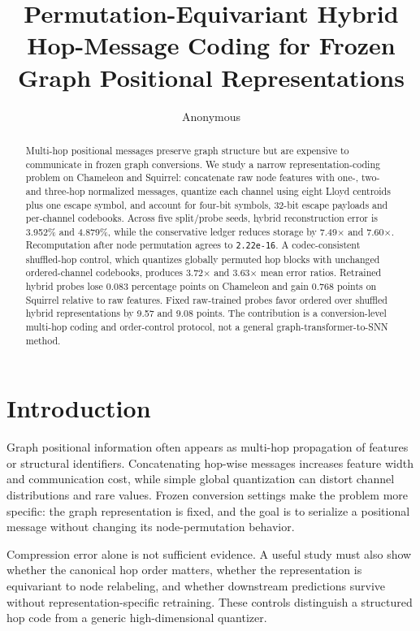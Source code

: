 \documentclass{article}
\title{Permutation-Equivariant Hybrid Hop-Message Coding for Frozen Graph Positional Representations}
\author{Anonymous}
\begin{document}
\begin{abstract}
Multi-hop positional messages preserve graph structure but are expensive to communicate in frozen graph conversions. We study a narrow representation-coding problem on Chameleon and Squirrel: concatenate raw node features with one-, two- and three-hop normalized messages, quantize each channel using eight Lloyd centroids plus one escape symbol, and account for four-bit symbols, 32-bit escape payloads and per-channel codebooks. Across five split/probe seeds, hybrid reconstruction error is 3.952\% and 4.879\%, while the conservative ledger reduces storage by 7.49$\times$ and 7.60$\times$. Recomputation after node permutation agrees to \texttt{2.22e-16}. A codec-consistent shuffled-hop control, which quantizes globally permuted hop blocks with unchanged ordered-channel codebooks, produces 3.72$\times$ and 3.63$\times$ mean error ratios. Retrained hybrid probes lose 0.083 percentage points on Chameleon and gain 0.768 points on Squirrel relative to raw features. Fixed raw-trained probes favor ordered over shuffled hybrid representations by 9.57 and 9.08 points. The contribution is a conversion-level multi-hop coding and order-control protocol, not a general graph-transformer-to-SNN method.
\end{abstract}

\maketitle

\section{Introduction}


Graph positional information often appears as multi-hop propagation of features or structural identifiers. Concatenating hop-wise messages increases feature width and communication cost, while simple global quantization can distort channel distributions and rare values. Frozen conversion settings make the problem more specific: the graph representation is fixed, and the goal is to serialize a positional message without changing its node-permutation behavior.

Compression error alone is not sufficient evidence. A useful study must also show whether the canonical hop order matters, whether the representation is equivariant to node relabeling, and whether downstream predictions survive without representation-specific retraining. These controls distinguish a structured hop code from a generic high-dimensional quantizer.
\end{document}
